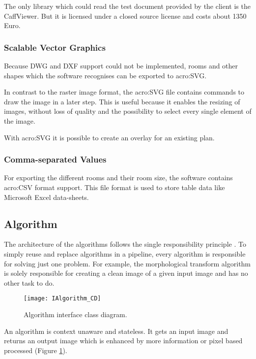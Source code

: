 The only library which could read the test document provided by the client is the CaffViewer. But it is licensed under a closed source license and costs about 1350 Euro.

\subsubsection{Scalable Vector Graphics}
Because DWG and DXF support could not be implemented, rooms and other shapes which the software recognises can be exported to \gls{acro:SVG}.

In contrast to the raster image format, the \gls{acro:SVG} file contains commands to draw the image in a later step. This is useful because it enables the resizing of images, without loss of quality and the possibility to select every single element of the image.

With \gls{acro:SVG} it is possible to create an overlay for an existing plan.

\subsubsection{Comma-separated Values}
For exporting the different rooms and their room size, the software contains \gls{acro:CSV} format support. This file format is used to store table data like Microsoft Excel data-sheets.

\pagebreak
\subsection{Algorithm}
\label{sub:algorithm}
The architecture of the algorithms follows the single responsibility principle \citep[p.~484]{mclaughlin_pollice_west_2010}. To simply reuse and replace algorithms in a pipeline, every algorithm is responsible for solving just one problem. For example, the morphological transform algorithm is solely responsible for creating a clean image of a given input image and has no other task to do.

\begin{figure}[h]
  \centering
      \texttt{[image: IAlgorithm\_CD]}
  \caption{Algorithm interface class diagram.}
  \label{fig:IAlgorithm_CD}
\end{figure}

An algorithm is context unaware and stateless. It gets an input image and returns an output image which is enhanced by more information or pixel based processed (Figure \ref{fig:IAlgorithm_CD}).


